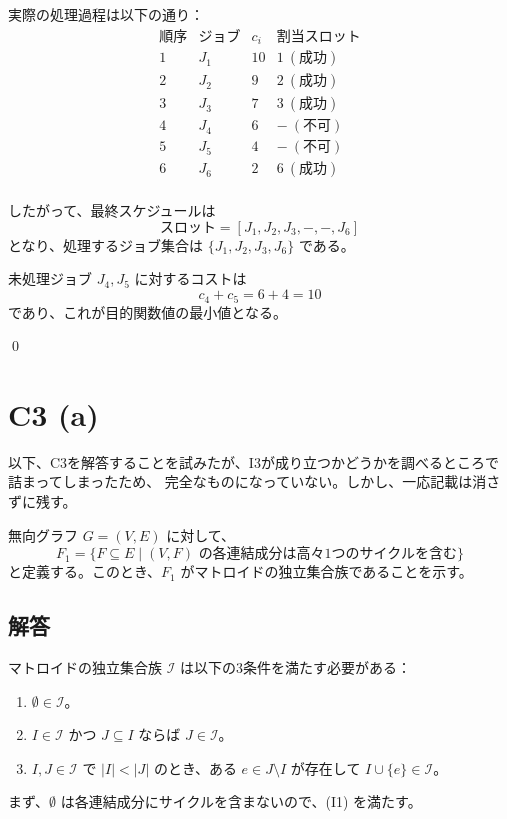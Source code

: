 \documentclass[a4paper]{ltjsarticle}
\begin{document}
実際の処理過程は以下の通り：
\[
\begin{array}{c|c|c|c}
\text{順序} & \text{ジョブ} & c_i & \text{割当スロット} \\ \hline
1 & J_1 & 10 & 1 \ (\text{成功}) \\
2 & J_2 & 9  & 2 \ (\text{成功}) \\
3 & J_3 & 7  & 3 \ (\text{成功}) \\
4 & J_4 & 6  & - \ (\text{不可}) \\
5 & J_5 & 4  & - \ (\text{不可}) \\
6 & J_6 & 2  & 6 \ (\text{成功}) \\
\end{array}
\]

したがって、最終スケジュールは
\[
\text{スロット} = [J_1, J_2, J_3, -, -, J_6]
\]
となり、処理するジョブ集合は $\{J_1, J_2, J_3, J_6\}$ である。

未処理ジョブ $J_4, J_5$ に対するコストは
\[
c_4 + c_5 = 6 + 4 = 10
\]
であり、これが目的関数値の最小値となる。

\qed

\section*{C3 (a)}

以下、C3を解答することを試みたが、I3が成り立つかどうかを調べるところで詰まってしまったため、
完全なものになっていない。しかし、一応記載は消さずに残す。

無向グラフ $G=(V,E)$ に対して、
\[
F_1 = \{ F \subseteq E \mid (V,F) \text{ の各連結成分は高々1つのサイクルを含む} \}
\]
と定義する。このとき、$F_1$ がマトロイドの独立集合族であることを示す。

\subsection*{解答}
マトロイドの独立集合族 $\mathcal{I}$ は以下の3条件を満たす必要がある：
\begin{enumerate}
  \item[(I1)] $\emptyset \in \mathcal{I}$。
  \item[(I2)] $I \in \mathcal{I}$ かつ $J \subseteq I$ ならば $J \in \mathcal{I}$。
  \item[(I3)] $I,J \in \mathcal{I}$ で $|I| < |J|$ のとき、ある $e \in J \setminus I$ が存在して $I \cup \{e\} \in \mathcal{I}$。
\end{enumerate}

まず、$\emptyset$ は各連結成分にサイクルを含まないので、(I1) を満たす。
\end{document}
